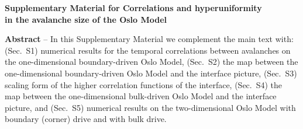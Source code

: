 \documentclass[doublecol]{epl2}
\newcommand{\latin}[1]{{\it #1}}
\newcommand{\plaind}{\text{d}}
\begin{document}
\begin{widetext}
\begin{center}
\textbf{\large 
Supplementary Material for  Correlations and hyperuniformity\\ in the avalanche size of the Oslo Model}
\end{center}
\textbf{Abstract} -- In this Supplementary Material we complement the main text with: (Sec.~S1) numerical results for the temporal correlations
between avalanches on the one-dimensional boundary-driven Oslo Model, (Sec.~S2) the map between the  one-dimensional
boundary-driven Oslo Model and the interface picture, (Sec.~S3) scaling form of the higher correlation functions of
the interface, (Sec.~S4) the map between the one-dimensional bulk-driven Oslo Model and the interface picture, and (Sec.~S5)
numerical results on the two-dimensional Oslo Model with boundary (corner) drive and with bulk drive.

\end{widetext}

\pagebreak

\newcommand{\CCbar}{\overline{\mathcal{C}}}
\newcommand{\dint}[1]{\mathchoice{\!\plaind#1\,}{\!\plaind#1\,}{\!\plaind#1\,}{\!\plaind#1\,}}
\newcommand{\cf}{\latin{cf.}\@\xspace}



\setcounter{equation}{0}
\setcounter{figure}{0}
\setcounter{table}{0}
\setcounter{page}{1}
\renewcommand{\theequation}{S\arabic{equation}}
\renewcommand{\thefigure}{S\arabic{figure}}
\renewcommand{\thesubfigure}{(\alph{subfigure})}


\end{document}

